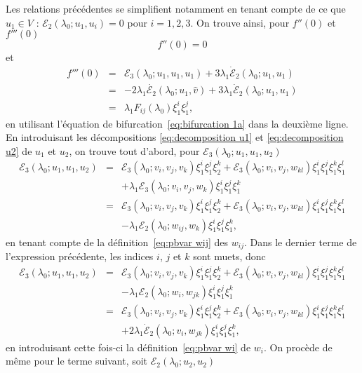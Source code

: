 \documentclass{article}
\begin{document}
Les relations précédentes se simplifient notamment en tenant compte de
ce que $u_1∈V$ : $ℰ_2 (λ_0 ; u_1, u_i) = 0$ pour $i = 1,
2, 3$. On trouve ainsi, pour $f'' (0)$ et $f''' (0)$
\begin{equation}
  \label{eq:DL energie derivee 2nde} f'' (0) = 0
\end{equation}
et
\begin{eqnarray}
  f''' (0) & = & ℰ_3 (λ_0 ; u_1, u_1, u_1) + 3 λ_1
  \dot{ℰ}_2 (λ_0 ; u_1, u_1) \nonumber\\
  & = & - 2 λ_1  \dot{ℰ_2} (λ_0 ; u_1, \hat{v}) + 3
  λ_1  \dot{ℰ}_2 (λ_0 ; u_1, u_1) \nonumber\\
  & = & λ_1 F_{i  j} (λ_0) ξ_1^i ξ_1^j,  \label{eq:DL
  energie derivee 3ieme}
\end{eqnarray}
en utilisant l'équation de bifurcation~\eqref{eq:bifurcation 1a} dans la
deuxième ligne. En introduisant les décompositions
\eqref{eq:decomposition u1} et \eqref{eq:decomposition u2} de $u_1$ et $u_2$,
on trouve tout d'abord, pour $ℰ_3 (λ_0 ; u_1, u_1, u_2)$
\begin{eqnarray*}
  ℰ_3 (λ_0 ; u_1, u_1, u_2) & = & ℰ_3 (λ_0 ;
  v_i, v_j, v_k) ξ_1^i ξ_1^j ξ_2^k +ℰ_3 (λ_0 ; v_i, v_j,
  w_{k  l}) ξ_1^i ξ_1^j ξ_1^k ξ_1^l\\
  &  &  + λ_1 ℰ_3 (λ_0 ; v_i, v_j, w_k)
  ξ_1^i ξ_1^j ξ_1^k\\
  & = & ℰ_3 (λ_0 ; v_i, v_j, v_k) ξ_1^i ξ_1^j ξ_2^k
  +ℰ_3 (λ_0 ; v_i, v_j, w_{k  l}) ξ_1^i ξ_1^j
  ξ_1^k ξ_1^l\\
  &  &  - λ_1 ℰ_2 (λ_0 ; w_{i  j},
  w_k) ξ_1^i ξ_1^j ξ_1^k,
\end{eqnarray*}
en tenant compte de la définition~\eqref{eq:pbvar wij} des $w_{i
j}$. Dans le dernier terme de l'expression précédente, les indices
$i$, $j$ et $k$ sont muets, donc
\begin{eqnarray*}
  ℰ_3 (λ_0 ; u_1, u_1, u_2) & = & ℰ_3 (λ_0 ;
  v_i, v_j, v_k) ξ_1^i ξ_1^j ξ_2^k +ℰ_3 (λ_0 ; v_i, v_j,
  w_{k  l}) ξ_1^i ξ_1^j ξ_1^k ξ_1^l\\
  &  &  - λ_1 ℰ_2 (λ_0 ; w_{i }, w_{j
   k}) ξ_1^i ξ_1^j ξ_1^k\\
  & = & ℰ_3 (λ_0 ; v_i, v_j, v_k) ξ_1^i ξ_1^j ξ_2^k
  +ℰ_3 (λ_0 ; v_i, v_j, w_{k  l}) ξ_1^i ξ_1^j
  ξ_1^k ξ_1^l\\
  &  &  + 2 λ_1  \dot{ℰ}_2 (λ_0 ; v_{i
  }, w_{j  k}) ξ_1^i ξ_1^j ξ_1^k,
\end{eqnarray*}
en introduisant cette fois-ci la définition~\eqref{eq:pbvar wi} de $w_i .$
On procède de même pour le terme suivant, soit $ℰ_2
(λ_0 ; u_2, u_2)$
\end{document}
